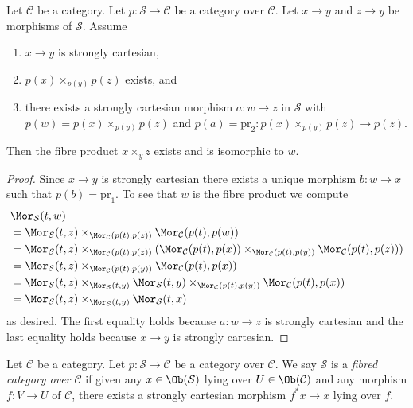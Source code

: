 \begin{lemma}
\label{lemma-strongly-cartesian-fibre-product}
Let $\mathcal{C}$ be a category.
Let $p : \mathcal{S} \to \mathcal{C}$ be a category over $\mathcal{C}$.
Let $x \to y$ and $z \to y$ be morphisms of $\mathcal{S}$.
Assume
\begin{enumerate}
\item $x \to y$ is strongly cartesian,
\item $p(x) \times_{p(y)} p(z)$ exists, and
\item there exists a strongly cartesian morphism $a : w \to z$ in
$\mathcal{S}$ with $p(w) = p(x) \times_{p(y)} p(z)$ and
$p(a) = \text{pr}_2 : p(x) \times_{p(y)} p(z) \to p(z)$.
\end{enumerate}
Then the fibre product $x \times_y z$ exists and is isomorphic to $w$.
\end{lemma}

\begin{proof}
Since $x \to y$ is strongly cartesian there exists a unique morphism
$b : w \to x$ such that $p(b) = \text{pr}_1$. To see that $w$ is the
fibre product we compute
\begin{align*}
& \Mor_\mathcal{S}(t, w) \\
& = \Mor_\mathcal{S}(t, z)
\times_{\Mor_\mathcal{C}(p(t), p(z))}
\Mor_\mathcal{C}(p(t), p(w)) \\
& = \Mor_\mathcal{S}(t, z)
\times_{\Mor_\mathcal{C}(p(t), p(z))}
(\Mor_\mathcal{C}(p(t), p(x))
\times_{\Mor_\mathcal{C}(p(t), p(y))}
\Mor_\mathcal{C}(p(t), p(z))) \\
& = \Mor_\mathcal{S}(t, z)
\times_{\Mor_\mathcal{C}(p(t), p(y))}
\Mor_\mathcal{C}(p(t), p(x)) \\
& = \Mor_\mathcal{S}(t, z)
\times_{\Mor_\mathcal{S}(t, y)}
\Mor_\mathcal{S}(t, y)
\times_{\Mor_\mathcal{C}(p(t), p(y))}
\Mor_\mathcal{C}(p(t), p(x)) \\
& = \Mor_\mathcal{S}(t, z)
\times_{\Mor_\mathcal{S}(t, y)}
\Mor_\mathcal{S}(t, x)
\end{align*}
as desired. The first equality holds because $a : w \to z$ is strongly
cartesian and the last equality holds because $x \to y$ is strongly
cartesian.
\end{proof}

\begin{definition}
\label{definition-fibred-category}
Let $\mathcal{C}$ be a category.
Let $p : \mathcal{S} \to \mathcal{C}$ be a category over $\mathcal{C}$.
We say $\mathcal{S}$ is a {\it fibred category over $\mathcal{C}$}
if given any $x \in \Ob(\mathcal{S})$ lying over
$U \in \Ob(\mathcal{C})$ and any morphism $f : V \to U$ of
$\mathcal{C}$, there exists a strongly cartesian morphism $f^*x \to x$
lying over $f$.
\end{definition}

